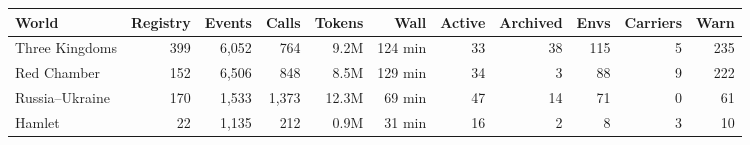 \begin{tabular}{lrrrrrrrrrr}
\toprule
World & Registry & Events & Calls & Tokens & Wall & Active & Archived & Envs & Carriers & Warn \\
\midrule
Three Kingdoms & 399 & 6,052 & 764 & 9.2M & 124 min & 33 & 38 & 115 & 5 & 235 \\
Red Chamber & 152 & 6,506 & 848 & 8.5M & 129 min & 34 & 3 & 88 & 9 & 222 \\
Russia--Ukraine & 170 & 1,533 & 1,373 & 12.3M & 69 min & 47 & 14 & 71 & 0 & 61 \\
Hamlet & 22 & 1,135 & 212 & 0.9M & 31 min & 16 & 2 & 8 & 3 & 10 \\
\bottomrule
\end{tabular}
